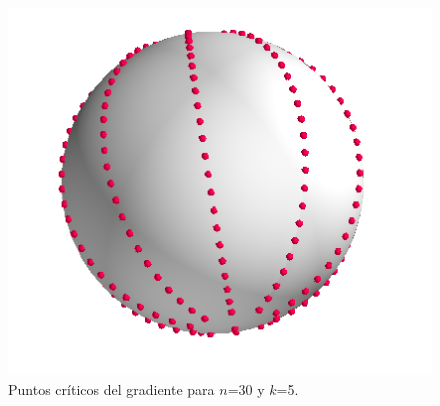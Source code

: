 \begin{figure}[H]
	\centering
	\includegraphics[scale=0.5]{img/gradient_30_5.png}
	\caption{Puntos críticos del gradiente para $n$=30 y $k$=5.}
\end{figure}
